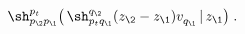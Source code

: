 \begin{equation}\label{2ndcomp}
\sh_{p_\2p_\1}^{p_t}\big(\,\sh_{p_tq_\1}^{q_\2}(z_\2-z_\1)v_{q_\1}^{}\,|\,z_\1\big )
\;.
\end{equation}

